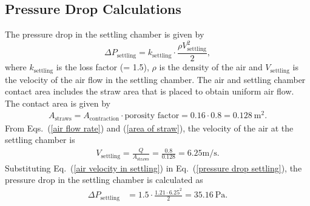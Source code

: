 \subsection{Pressure Drop Calculations}

The pressure drop in the settling chamber is given by
\begin{equation}\label{pressure drop settling}
    \Delta P_{\text{settling}} = k_{\text{settling}} \cdot \frac{\rho V_{\text{settling}}^2}{2}, 
\end{equation}
where $k_{\text{settling}}$ is the loss factor (= 1.5), $\rho$ is the density of the air and $V_{\text{settling}}$ is the velocity of the air flow in the settling chamber. The air and settling chamber contact area includes the straw area that is placed to obtain uniform air flow. The contact area is given by
\begin{align}\label{area of straw}
A_{\text{straws}} = A_{\text{contraction}}\cdot \text{porosity factor} = 0.16 \cdot 0.8 = 0.128~\text{m}^2.
\end{align}
From Eqs.~(\ref{air flow rate}) and (\ref{area of straw}), the velocity of the air at the settling chamber is 
\begin{align}\label{air velocity in settling}
    V_{\text{settling}} = \frac{Q}{A_{\text{straws}}} = \frac{0.8}{0.128} = 6.25  \text{m/s}.
\end{align}
Substituting Eq.~(\ref{air velocity in settling}) in Eq.~(\ref{pressure drop settling}), the pressure drop in the settling chamber is calculated as
\begin{align}\label{pressure drop settling value}
    \Delta P_{\text{settling}} &= 1.5 \cdot \frac{1.21 \cdot 6.25^2}{2} = 35.16~\text{Pa}.
\end{align}

